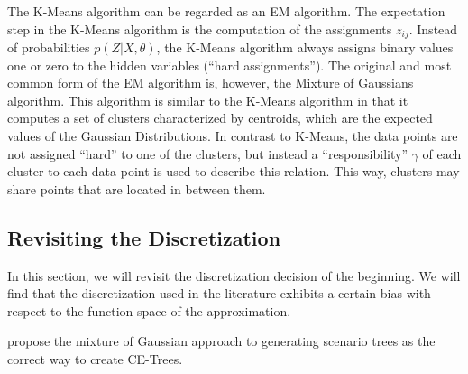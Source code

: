 The K-Means algorithm can be regarded as an EM algorithm. The expectation step in the K-Means algorithm is the computation of the assignments $z_{ij}$. Instead of probabilities $p(Z|X,\theta)$, the K-Means algorithm always assigns binary values one or zero to the hidden variables (``hard assignments''). The original and most common form of the EM algorithm is, however, the Mixture of Gaussians algorithm. This algorithm is similar to the K-Means algorithm in that it computes a set of clusters characterized by centroids, which are the expected values of the Gaussian Distributions. In contrast to K-Means, the data points are not assigned ``hard'' to one of the clusters, but instead a ``responsibility'' $\gamma$ of each cluster to each data point is used to describe this relation. This way, clusters may share points that are located in between them.
\subsection{Revisiting the Discretization}
\label{sec:revisiting-discretization}
In this section, we will revisit the discretization decision of the beginning.
We will find that the discretization used in the literature exhibits a certain bias with respect to the function space of the approximation. 

propose the mixture of Gaussian approach to generating scenario trees as the correct way to create CE-Trees.


